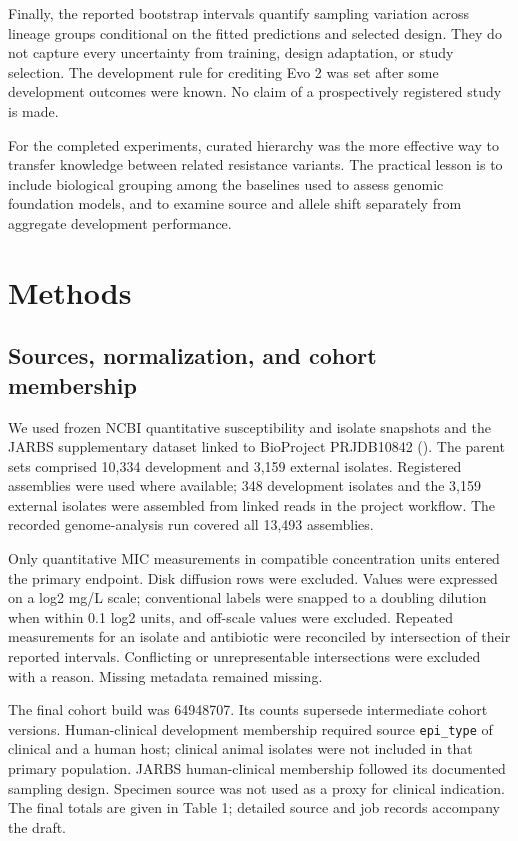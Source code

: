 \documentclass[
  american,
  11pt,
]{article}
\begin{document}
Finally, the reported bootstrap intervals quantify sampling variation
across lineage groups conditional on the fitted predictions and selected
design. They do not capture every uncertainty from training, design
adaptation, or study selection. The development rule for crediting Evo 2
was set after some development outcomes were known. No claim of a
prospectively registered study is made.

For the completed experiments, curated hierarchy was the more effective
way to transfer knowledge between related resistance variants. The
practical lesson is to include biological grouping among the baselines
used to assess genomic foundation models, and to examine source and
allele shift separately from aggregate development performance.

\section{Methods}\label{methods}

\subsection{Sources, normalization, and cohort
membership}\label{sources-normalization-and-cohort-membership}

We used frozen NCBI quantitative susceptibility and isolate snapshots
and the JARBS supplementary dataset linked to BioProject PRJDB10842
(). The parent sets
comprised 10,334 development and 3,159 external isolates. Registered
assemblies were used where available; 348 development isolates and the
3,159 external isolates were assembled from linked reads in the project
workflow. The recorded genome-analysis run covered all 13,493
assemblies.

Only quantitative MIC measurements in compatible concentration units
entered the primary endpoint. Disk diffusion rows were excluded. Values
were expressed on a log2 mg/L scale; conventional labels were snapped to
a doubling dilution when within 0.1 log2 units, and off-scale values
were excluded. Repeated measurements for an isolate and antibiotic were
reconciled by intersection of their reported intervals. Conflicting or
unrepresentable intersections were excluded with a reason. Missing
metadata remained missing.

The final cohort build was 64948707. Its counts supersede intermediate
cohort versions. Human-clinical development membership required source
\texttt{epi\_type} of clinical and a human host; clinical animal
isolates were not included in that primary population. JARBS
human-clinical membership followed its documented sampling design.
Specimen source was not used as a proxy for clinical indication. The
final totals are given in Table 1; detailed source and job records
accompany the draft.
\end{document}
